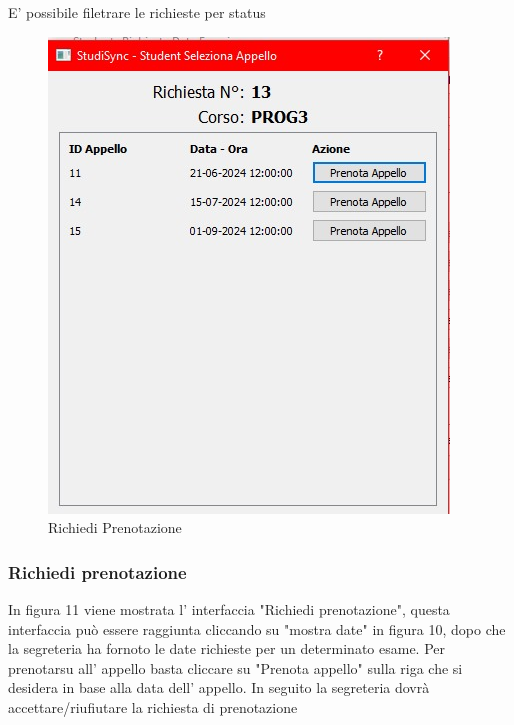 \documentclass{article}
\begin{document}
E' possibile filetrare le richieste per status

\newpage

\begin{figure}
    \centering
    \includegraphics[width=0.8\linewidth]{IMG/RichiediPrenotazioneAppello.jpg}
    \caption{Richiedi Prenotazione}
    \label{fig:enter-label}
\end{figure}

\subsubsection{Richiedi prenotazione}

In figura 11 viene mostrata l' interfaccia "Richiedi prenotazione", questa interfaccia può essere raggiunta cliccando su "mostra date" in figura 10, dopo che la segreteria ha fornoto le date richieste per un determinato esame.
Per prenotarsu all' appello basta cliccare su "Prenota appello" sulla riga che si desidera in base alla data dell' appello.
In seguito la segreteria dovrà accettare/riufiutare la richiesta di prenotazione
\end{document}
